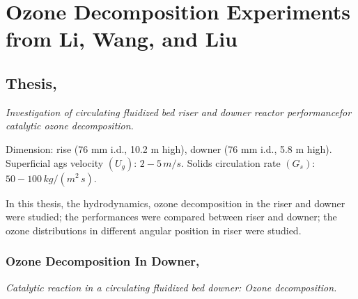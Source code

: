 %
%
%
\chapter{Ozone Decomposition Experiments from Li, Wang, and Liu}
\section[Li, Dongbing, 2010]{Thesis, \cite{li2010}}
\textit{Investigation of circulating fluidized bed riser and downer reactor performancefor catalytic ozone decomposition.}

Dimension: rise (76 mm i.d., 10.2 m high), downer (76 mm i.d., 5.8 m high). Superficial ags velocity $(U_g)$: $2-5\,\si{m/s}$. 
Solids circulation rate $(G_s)$: $50-100\,\si{kg/(m^2\,s)}$.

In this thesis, the hydrodynamics, ozone decomposition in the riser and downer were studied; 
the performances were compared between riser and downer; 
the ozone distributions in different angular position in riser were studied.

\subsection[Ozone Decomposition In Downer, 2011]{Ozone Decomposition In Downer, \cite{li2011catalytic}}
\textit{Catalytic reaction in a circulating ﬂuidized bed downer: Ozone decomposition.}
